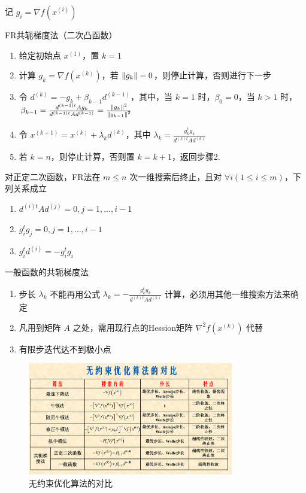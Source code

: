 \begin{note}
    记 $g_i = \nabla f(x^{(i)})$

    FR共轭梯度法（二次凸函数）\begin{enumerate}
        \item 给定初始点 $x^{(1)}$，置 $k = 1$
        \item 计算 $g_k = \nabla f(x^{(k)})$，若 $\norm{g_k} = 0$，则停止计算，否则进行下一步
        \item 令 $d^{(k)} = -g_k + \beta_{k - 1}d^{(k - 1)}$，其中，当 $k = 1$ 时，$\beta_0 = 0$，当 $k > 1$ 时，$\beta_{k - 1} = \frac{d^{(k - 1)t}Ag_k}{d^{(k - 1)t}Ad^{(k - 1)}} = \frac{\norm{g_k}^2}{\norm{g_{k - 1}}^2}$
        \item 令 $x^{(k + 1)} = x^{(k)} + \lambda_kd^{(k)}$，其中 $\lambda_k = \frac{g_k^tg_k}{d^{(k)t}Ad^{(k)}}$
        \item 若 $k = n$，则停止计算，否则置 $k = k + 1$，返回步骤2.
    \end{enumerate}
\end{note}

\begin{theorem}
    对正定二次函数，FR法在 $m \le n$ 次一维搜索后终止，且对 $\forall i(1 \le i \le m)$，下列关系成立
    \begin{enumerate}
        \item $d^{(i)t}Ad^{(j)} = 0, j = 1, \dots, i - 1$
        \item $g_i^tg_j = 0, j = 1, \dots, i - 1$
        \item $g_i^td^{(i)} = -g_i^tg_i$
    \end{enumerate}
\end{theorem}

\begin{note}
    一般函数的共轭梯度法\begin{enumerate}
        \item 步长 $\lambda_k$ 不能再用公式 $\lambda_k = -\frac{g_k^tg_k}{d^{(k)t}Ad^{(k)}}$ 计算，必须用其他一维搜索方法来确定
        \item 凡用到矩阵 $A$ 之处，需用现行点的Hession矩阵 $\nabla^2f(x^{(k)})$ 代替
        \item 有限步迭代达不到极小点
    \end{enumerate}
\end{note}

\begin{figure}[htbp]
    \centering
    \includegraphics[width=0.8\textwidth]{./figures/img3.png}
    \caption{无约束优化算法的对比 \label{fig3}}
\end{figure}
